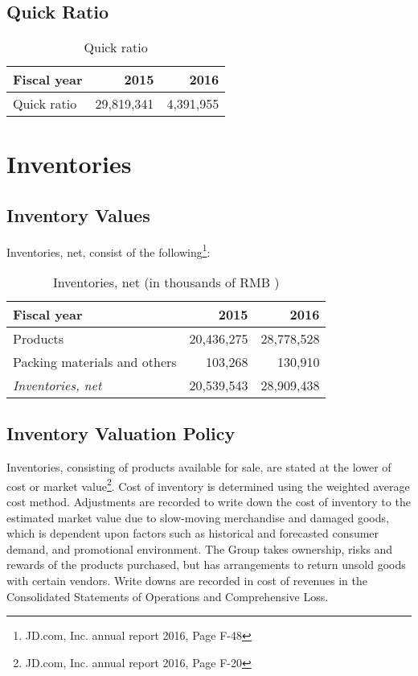 \section{Quick Ratio}
\begin{table}[H]	
	\begin{center}
		\begin{tabular}{lrr}
			\toprule
			\textbf{Fiscal year}&\textbf{2015}&\textbf{2016}\\
			\midrule
			Quick ratio&29,819,341&4,391,955\\
			\bottomrule
		\end{tabular}
	\end{center}
	\caption{Quick ratio}\label{table:1}
\end{table}


\chapter{Inventories}
\section{Inventory Values}

Inventories, net, consist of the following\footnote{JD.com, Inc. annual report 2016, Page F-48}:
\begin{table}[H]	
	\begin{center}
		\begin{tabular}{lrr}
			\toprule
			\textbf{Fiscal year}&\textbf{2015}&\textbf{2016}\\
			\midrule
			Products&20,436,275&28,778,528\\
			Packing materials and others&103,268&130,910\\
			\qquad\emph{Inventories, net}&20,539,543&28,909,438\\
			\bottomrule
		\end{tabular}
	\end{center}
	\caption{Inventories, net (in thousands of RMB \textyen)}\label{table:1}
\end{table}

\section{Inventory Valuation Policy}
Inventories, consisting of products available for sale, are stated at the lower of cost or market value\footnote{JD.com, Inc. annual report 2016, Page F-20}. Cost of inventory is determined using the weighted
average cost method. Adjustments are recorded to write down the cost of inventory to the estimated market value due to slow-moving merchandise and
damaged goods, which is dependent upon factors such as historical and forecasted consumer demand, and promotional environment. The Group takes
ownership, risks and rewards of the products purchased, but has arrangements to return unsold goods with certain vendors. Write downs are recorded in cost of
revenues in the Consolidated Statements of Operations and Comprehensive Loss.


